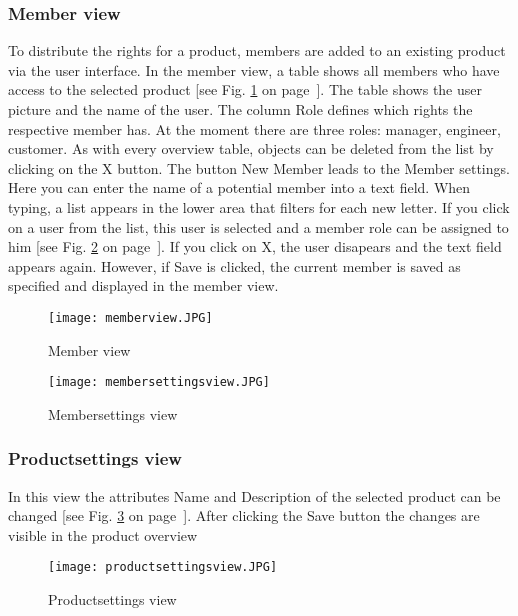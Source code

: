     \subsubsection*{Member view}
    To distribute the rights for a product, members are added to an existing product via the user interface. In the member view, a table shows all members who have access to the selected product [see Fig. \ref{fig: memberview} on page~\pageref{fig: memberview}]. The table shows the user picture and the name of the user. The column Role defines which rights the respective member has. At the moment there are three roles: manager, engineer, customer. As with every overview table, objects can be deleted from the list by clicking on the X button. The button New Member leads to the Member settings. Here you can enter the name of a potential member into a text field. When typing, a list appears in the lower area that filters for each new letter. If you click on a user from the list, this user is selected and a member role can be assigned to him [see Fig. \ref{fig: membersettingsview} on page~\pageref{fig: membersettingsview}]. If you click on X, the user disapears and the text field appears again. However, if Save is clicked, the current member is saved as specified and displayed in the member view.
    
    \begin{figure}[h]
        \centering
        \texttt{[image: memberview.JPG]}
        \caption{Member view}
        \label{fig: memberview}
    \end{figure}

    \begin{figure}[h]
        \centering
        \texttt{[image: membersettingsview.JPG]}
        \caption{Membersettings view}
        \label{fig: membersettingsview}
    \end{figure}

    \subsubsection*{Productsettings view}
    In this view the attributes Name and Description of the selected product can be changed [see Fig. \ref{fig: productsettingsview} on page~\pageref{fig: productsettingsview}]. After clicking the Save button the changes are visible in the product overview
    \begin{figure}[h]
        \centering
        \texttt{[image: productsettingsview.JPG]}
        \caption{Productsettings view}
        \label{fig: productsettingsview}
    \end{figure}